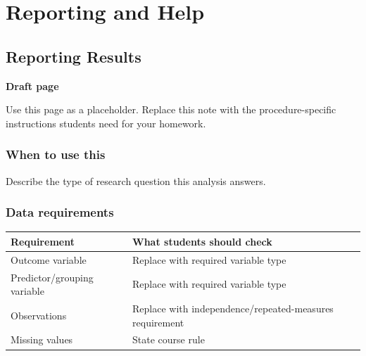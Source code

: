 \documentclass[
  letterpaper,
  DIV=11,
  numbers=noendperiod]{scrreprt}
\newcounter{none} %
\begin{document}
\part{Reporting and Help}

\chapter{Reporting Results}\label{reporting-results}

\begin{tcolorbox}[enhanced jigsaw, arc=.35mm, bottomrule=.15mm, breakable, colback=white, colframe=quarto-callout-note-color-frame, left=2mm, leftrule=.75mm, opacityback=0, rightrule=.15mm, toprule=.15mm]
\begin{minipage}[t]{5.5mm}
\textcolor{quarto-callout-note-color}{\faInfo}
\end{minipage}%
\begin{minipage}[t]{\textwidth - 5.5mm}

\vspace{-3mm}\textbf{Draft page}\vspace{3mm}

Use this page as a placeholder. Replace this note with the
procedure-specific instructions students need for your homework.

\end{minipage}%
\end{tcolorbox}

\section{When to use this}\label{when-to-use-this-11}

Describe the type of research question this analysis answers.

\section{Data requirements}\label{data-requirements-12}

{\def\LTcaptype{none} %
\begin{longtable}[]{@{}
  >{\raggedright\arraybackslash}p{}
  >{\raggedright\arraybackslash}p{}@{}}
\toprule\noalign{}
\begin{minipage}[b]{\linewidth}\raggedright
Requirement
\end{minipage} & \begin{minipage}[b]{\linewidth}\raggedright
What students should check
\end{minipage} \\
\midrule\noalign{}
\endhead
\bottomrule\noalign{}
\endlastfoot
Outcome variable & Replace with required variable type \\
Predictor/grouping variable & Replace with required variable type \\
Observations & Replace with independence/repeated-measures
requirement \\
Missing values & State course rule \\
\end{longtable}
}
\end{document}
